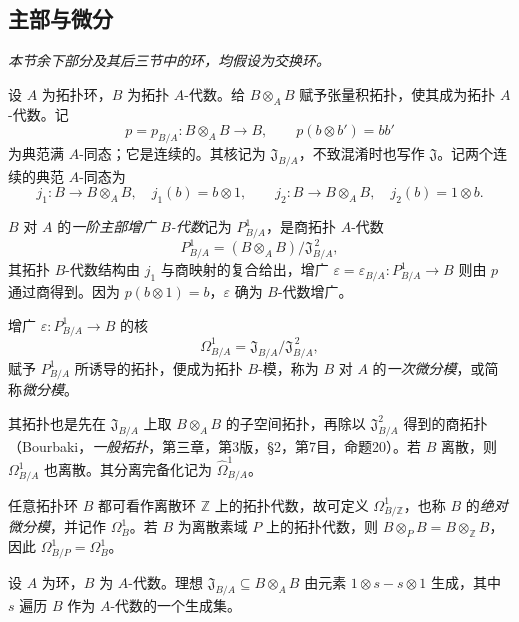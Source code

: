 \subsection{主部与微分}
\emph{本节余下部分及其后三节中的环，均假设为交换环。}

设 $A$ 为拓扑环，$B$ 为拓扑 $A$-代数。给 $B\otimes_A B$ 赋予张量积拓扑，使其成为拓扑 $A$-代数。记
\begin{equation}
 p=p_{B/A}:B\otimes_A B\longrightarrow B,
 \qquad p(b\otimes b')=bb'
 \tag{20.4.1.1}
\end{equation}
为典范满 $A$-同态；它是连续的。其核记为 $\mathfrak J_{B/A}$，不致混淆时也写作 $\mathfrak J$。记两个连续的典范 $A$-同态为
\[
 j_1:B\longrightarrow B\otimes_A B,\quad j_1(b)=b\otimes1,
 \qquad
 j_2:B\longrightarrow B\otimes_A B,\quad j_2(b)=1\otimes b.
\]

$B$ 对 $A$ 的\emph{一阶主部增广 $B$-代数}记为 $P^1_{B/A}$，是商拓扑 $A$-代数
\begin{equation}
 P^1_{B/A}=(B\otimes_A B)/\mathfrak J_{B/A}^{\,2},
 \tag{20.4.2.1}
\end{equation}
其拓扑 $B$-代数结构由 $j_1$ 与商映射的复合给出，增广
$\varepsilon=\varepsilon_{B/A}:P^1_{B/A}\to B$ 则由 $p$ 通过商得到。因为 $p(b\otimes1)=b$，$\varepsilon$ 确为 $B$-代数增广。

增广 $\varepsilon:P^1_{B/A}\to B$ 的核
\begin{equation}
 \Omega^1_{B/A}=\mathfrak J_{B/A}/\mathfrak J_{B/A}^{\,2},
 \tag{20.4.3.1}
\end{equation}
赋予 $P^1_{B/A}$ 所诱导的拓扑，便成为拓扑 $B$-模，称为 $B$ 对 $A$ 的\emph{一次微分模}，或简称\emph{微分模}。

其拓扑也是先在 $\mathfrak J_{B/A}$ 上取 $B\otimes_A B$ 的子空间拓扑，再除以 $\mathfrak J_{B/A}^2$ 得到的商拓扑（Bourbaki，\textit{一般拓扑}，第三章，第3版，§2，第7目，命题20）。若 $B$ 离散，则 $\Omega^1_{B/A}$ 也离散。其分离完备化记为 $\widehat\Omega^1_{B/A}$。

任意拓扑环 $B$ 都可看作离散环 $\mathbb Z$ 上的拓扑代数，故可定义 $\Omega^1_{B/\mathbb Z}$，也称 $B$ 的\emph{绝对微分模}，并记作 $\Omega^1_B$。若 $B$ 为离散素域 $P$ 上的拓扑代数，则 $B\otimes_P B=B\otimes_{\mathbb Z}B$，因此 $\Omega^1_{B/P}=\Omega^1_B$。

设 $A$ 为环，$B$ 为 $A$-代数。理想 $\mathfrak J_{B/A}\subseteq B\otimes_A B$ 由元素 $1\otimes s-s\otimes1$ 生成，其中 $s$ 遍历 $B$ 作为 $A$-代数的一个生成集。

